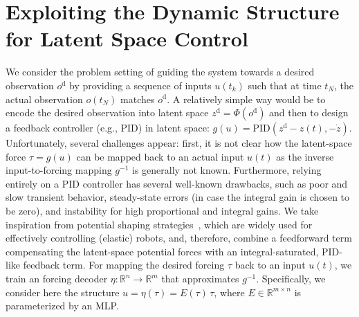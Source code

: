 \section{Exploiting the Dynamic Structure for Latent Space Control}\label{sec:con:latent_space_control}

We consider the problem setting of guiding the system towards a desired observation $o^\mathrm{d}$ by providing a sequence of inputs $u(t_k)$ such that at time $t_N$, the actual observation $o(t_N)$ matches $o^\mathrm{d}$.
A relatively simple way would be to encode the desired observation into latent space $z^\mathrm{d} = \Phi(o^\mathrm{d})$ and then to design a feedback controller (e.g., PID) in latent space: $g(u) = \mathrm{PID}(z^\mathrm{d}-z(t), -\dot{z})$.
Unfortunately, several challenges appear: first, it is not clear how the latent-space force $\tau = g(u)$ can be mapped back to an actual input $u(t)$ as the inverse input-to-forcing mapping $g^{-1}$ is generally not known.
Furthermore, relying entirely on a PID controller has several well-known drawbacks, such as poor and slow transient behavior, steady-state errors (in case the integral gain is chosen to be zero), and instability for high proportional and integral gains.
We take inspiration from potential shaping strategies~\citep{bloch2001controlled, ortega2021pid}, which are widely used for effectively controlling (elastic) robots, and, therefore, combine a feedforward term compensating the latent-space potential forces with an integral-saturated, PID-like feedback term. For mapping the desired forcing $\tau$ back to an input $u(t)$, we train an forcing decoder $\eta: \mathbb{R}^{n} \to \mathbb{R}^{m}$ that approximates $g^{-1}$. Specifically, we consider here the structure $u = \eta(\tau) = E(\tau) \, \tau$, where $E \in \mathbb{R}^{m \times n}$ is parameterized by an \gls{MLP}.

